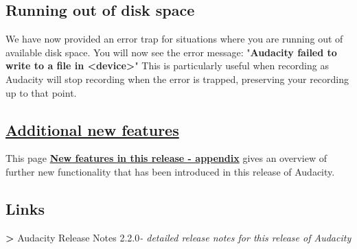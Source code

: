 \begin{multicols}{2}
\subsection{Running out of disk space}We have now provided an error trap for situations where you are running out of available disk space.
You will now see the error message:
"\textbf{Audacity failed to write to a file in <device>}"
This is particularly useful when recording as Audacity will stop recording when the error is trapped, preserving your recording up to that point.

\label{newXfeaturesXinXthisXreleaseXappendix}
\subsection{
\hyperref[\foo{newXfeaturesXinXthisXreleaseXappendixX}]{Additional new features}
}This page \textbf{
\hyperref[\foo{newXfeaturesXinXthisXreleaseXappendixX}]{New features in this release - appendix}
} gives an overview of further new functionality that has been introduced in this release of Audacity.

\subsection{Links}\textbf{>} Audacity Release Notes 2.2.0\textit{- detailed release notes for this release of Audacity}\end{multicols}